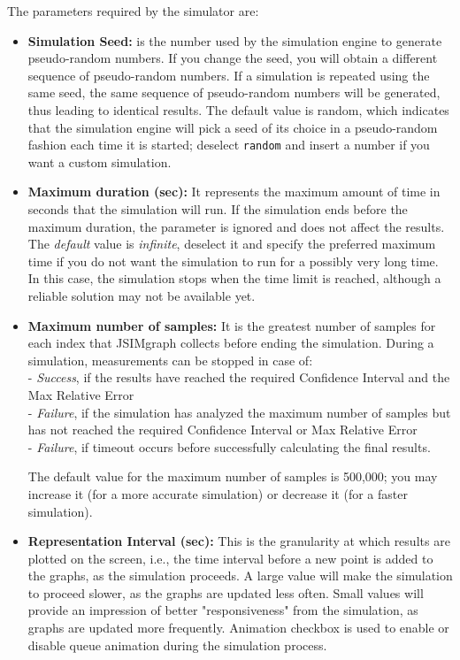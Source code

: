 The parameters required by the simulator are:
\begin{itemize}
\item \textbf{Simulation Seed:} is the number used by the
simulation engine to generate pseudo-random numbers. If you change
the seed, you will obtain a different sequence of pseudo-random
numbers. If a simulation is repeated using the same seed, the same
sequence of pseudo-random numbers will be generated, thus leading
to identical results. The default value is random, which indicates
that the simulation engine will pick a seed of its choice in a
pseudo-random fashion each time it is started; deselect
\texttt{random} and insert a number if you want a custom
simulation.

\item \textbf{Maximum duration (sec):} It represents the maximum
amount of time in seconds that the simulation will run. If the
simulation ends before the maximum duration, the parameter is
ignored and does not affect the results. The \emph{default} value
is \emph{infinite}, deselect it and specify the preferred maximum
time if you do not want the simulation to run for a possibly very
long time. In this case, the simulation stops when the time limit
is reached, although a reliable solution may not be available yet.

\item \textbf{Maximum number of samples:} It is the greatest
number of samples for each index that JSIMgraph collects before
ending the simulation. During a simulation, measurements can be
stopped in case of:\\
- \emph{Success}, if the results have reached the required
Confidence
Interval and the Max Relative Error\\
- \emph{Failure}, if the simulation has analyzed the maximum
number of samples but has not reached the required Confidence
Interval or
Max Relative Error\\
- \emph{Failure}, if timeout occurs before successfully
calculating the final results.

The default value for the maximum number of samples is 500,000;
 you may increase it (for a more accurate simulation) or decrease
it (for a faster simulation).

\item \textbf{Representation Interval (sec):} This is the
granularity at which results are plotted on the screen, i.e., the
time interval before a new point is added to the graphs, as the
simulation proceeds. A large value will make the simulation to
proceed slower, as the graphs are updated less often. Small values
will provide an impression of better "responsiveness" from the
simulation, as graphs are updated more frequently. Animation
checkbox is used to enable or disable queue animation during the
simulation process. \end{itemize}

